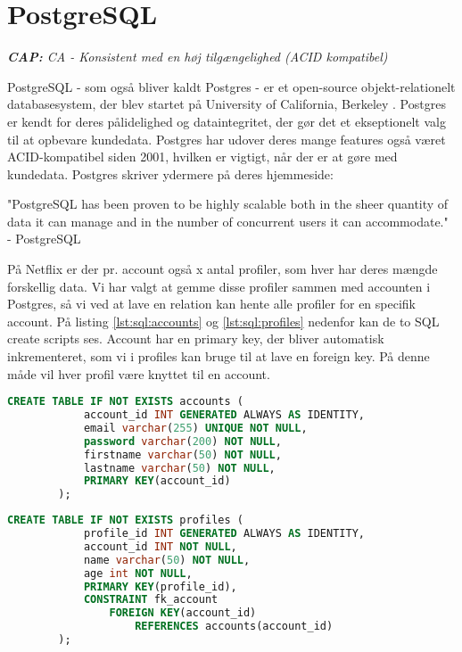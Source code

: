 \section{PostgreSQL}
\begin{displayquote}
    \textit{\textbf{CAP:} CA - Konsistent med en høj tilgængelighed (ACID kompatibel)}
\end{displayquote}
PostgreSQL - som også bliver kaldt Postgres - er et open-source objekt-relationelt databasesystem, der blev startet på University of California, Berkeley \cite{postgresabout}. Postgres er kendt for deres pålidelighed og dataintegritet, der gør det et ekseptionelt valg til at opbevare kundedata. Postgres har udover deres mange features også været ACID-kompatibel siden 2001, hvilken er vigtigt, når der er at gøre med kundedata. Postgres skriver ydermere på deres hjemmeside:
\begin{displayquote}
    "PostgreSQL has been proven to be highly scalable both in the sheer quantity of data it can manage and in the number of concurrent users it can accommodate." - PostgreSQL\cite{postgresabout}
\end{displayquote}
På Netflix er der pr. account også x antal profiler, som hver har deres mængde forskellig data. Vi har valgt at gemme disse profiler sammen med accounten i Postgres, så vi ved at lave en relation kan hente alle profiler for en specifik account. På listing \ref{lst:sql:accounts} og \ref{lst:sql:profiles} nedenfor kan de to SQL create scripts ses. Account har en primary key, der bliver automatisk inkrementeret, som vi i profiles kan bruge til at lave en foreign key. På denne måde vil hver profil være knyttet til en account.

\begin{tcolorbox}
    \lstset{style=sharpstyle}
    \begin{lstlisting}[language={SQL}, caption={Logs HBASE Model}, label={lst:sql:accounts}]
        CREATE TABLE IF NOT EXISTS accounts (
            account_id INT GENERATED ALWAYS AS IDENTITY,
            email varchar(255) UNIQUE NOT NULL,
            password varchar(200) NOT NULL,
            firstname varchar(50) NOT NULL,
            lastname varchar(50) NOT NULL,
            PRIMARY KEY(account_id)
        );
    \end{lstlisting}
\end{tcolorbox}

\begin{tcolorbox}
    \lstset{style=sharpstyle}
    \begin{lstlisting}[language={SQL}, caption={Logs HBASE Model}, label={lst:sql:profiles}]
        CREATE TABLE IF NOT EXISTS profiles (
            profile_id INT GENERATED ALWAYS AS IDENTITY,
            account_id INT NOT NULL,
            name varchar(50) NOT NULL,
            age int NOT NULL,
            PRIMARY KEY(profile_id),
            CONSTRAINT fk_account
                FOREIGN KEY(account_id)
                    REFERENCES accounts(account_id)
        );
    \end{lstlisting}
\end{tcolorbox}
